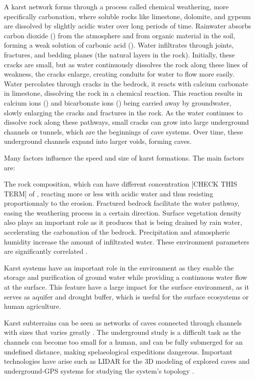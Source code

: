 A karst network forms through a process called chemical weathering, more specifically carbonation, where soluble rocks like limestone, dolomite, and gypsum are dissolved by slightly acidic water over long periods of time.  Rainwater absorbs carbon dioxide () from the atmosphere and from organic material in the soil, forming a weak solution of carbonic acid (). Water infiltrates through joints, fractures, and bedding planes (the natural layers in the rock). Initially, these cracks are small, but as water continuously dissolves the rock along these lines of weakness, the cracks enlarge, creating conduits for water to flow more easily. Water percolates through cracks in the bedrock, it reacts with calcium carbonate in limestone, dissolving the rock in a chemical reaction. This reaction results in calcium ions () and bicarbonate ions () being carried away by groundwater, slowly enlarging the cracks and fractures in the rock. As the water continues to dissolve rock along these pathways, small cracks can grow into large underground channels or tunnels, which are the beginnings of cave systems. Over time, these underground channels expand into larger voids, forming caves.

Many factors influence the speed and size of karst formations. The main factors are:
\begin{Itemize}
    \Item{} The rock composition, which can have different concentration [CHECK THIS TERM] of , reacting more or less with acidic water and thus resisting proportionnaly to the erosion.
    \Item{} Fractured bedrock facilitate the water pathway, easing the weathering process in a certain direction. 
    \Item{} Surface vegetation density also plays an important role as it produces  that is being drained by rain water, accelerating the carbonation of the bedrock. Precipitation and atmospheric humidity increase the amount of infiltrated water. These environment parameters are significantly correlated \cite{Bari2021}.
\end{Itemize}

Karst systems have an important role in the environment as they enable the storage and purification of ground water while providing a continuous water flow at the surface. This feature have a large impact for the surface environment, as it serves as aquifer and drought buffer, which is useful for the surface ecosystems or human agriculture.

Karst subterrains can be seen as networks of caves connected through channels with sizes that varies greatly \cite{Collon2017,Collon2021}. The underground study is a difficult task as the channels can become too small for a human, and can be fully submerged for an undefined distance, making spelaeological expeditions dangerous. Important technologies have arise such as LIDAR for the 3D modeling of explored caves and underground-GPS systems for studying the system's topology \cite{Collon2017}.



